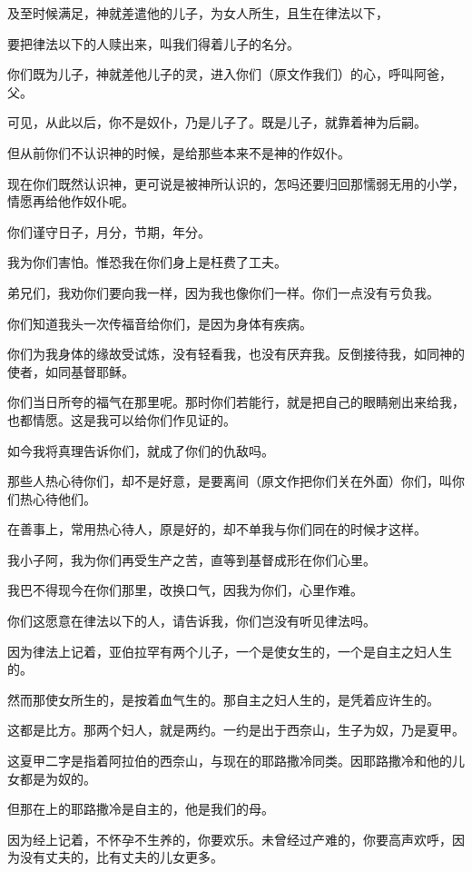 \documentclass[12pt,oneside]{book}
\begin{document}
及至时候满足，神就差遣他的儿子，为女人所生，且生在律法以下，

要把律法以下的人赎出来，叫我们得着儿子的名分。

你们既为儿子，神就差他儿子的灵，进入你们（原文作我们）的心，呼叫阿爸，父。

可见，从此以后，你不是奴仆，乃是儿子了。既是儿子，就靠着神为后嗣。

但从前你们不认识神的时候，是给那些本来不是神的作奴仆。

现在你们既然认识神，更可说是被神所认识的，怎吗还要归回那懦弱无用的小学，情愿再给他作奴仆呢。

你们谨守日子，月分，节期，年分。

我为你们害怕。惟恐我在你们身上是枉费了工夫。

弟兄们，我劝你们要向我一样，因为我也像你们一样。你们一点没有亏负我。

你们知道我头一次传福音给你们，是因为身体有疾病。

你们为我身体的缘故受试炼，没有轻看我，也没有厌弃我。反倒接待我，如同神的使者，如同基督耶稣。

你们当日所夸的福气在那里呢。那时你们若能行，就是把自己的眼睛剜出来给我，也都情愿。这是我可以给你们作见证的。

如今我将真理告诉你们，就成了你们的仇敌吗。

那些人热心待你们，却不是好意，是要离间（原文作把你们关在外面）你们，叫你们热心待他们。

在善事上，常用热心待人，原是好的，却不单我与你们同在的时候才这样。

我小子阿，我为你们再受生产之苦，直等到基督成形在你们心里。

我巴不得现今在你们那里，改换口气，因我为你们，心里作难。

你们这愿意在律法以下的人，请告诉我，你们岂没有听见律法吗。

因为律法上记着，亚伯拉罕有两个儿子，一个是使女生的，一个是自主之妇人生的。

然而那使女所生的，是按着血气生的。那自主之妇人生的，是凭着应许生的。

这都是比方。那两个妇人，就是两约。一约是出于西奈山，生子为奴，乃是夏甲。

这夏甲二字是指着阿拉伯的西奈山，与现在的耶路撒冷同类。因耶路撒冷和他的儿女都是为奴的。

但那在上的耶路撒冷是自主的，他是我们的母。

因为经上记着，不怀孕不生养的，你要欢乐。未曾经过产难的，你要高声欢呼，因为没有丈夫的，比有丈夫的儿女更多。
\end{document}

